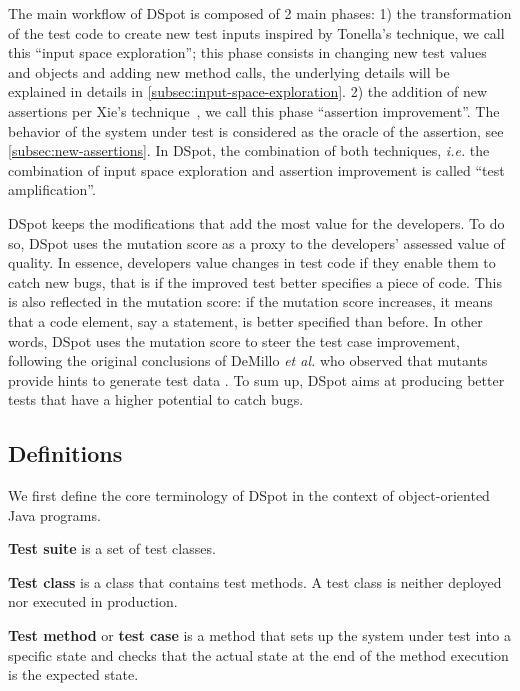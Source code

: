 \documentclass[table,xcdraw,smallextended]{svjour3}
\newcommand{\etal}{\textit{et al.}\xspace}
\newcommand{\ie}{\textit{i.e.}\xspace}
\newcommand{\dspot}{DSpot\xspace}
\newcommand{\ms}{mutation score\xspace}
\begin{document}
The main workflow of \dspot{} is composed of 2 main phases:
1) the transformation of the test code to create new test inputs inspired by Tonella's technique, we call this ``input space exploration''; this phase consists in changing new test values and objects and adding new method calls, the underlying details will be explained in details in \autoref{subsec:input-space-exploration}.
2) the addition of new assertions per Xie's technique~\cite{TaoXie2006}, we call this phase ``assertion improvement''. The behavior of the system under test is considered as the oracle of the assertion, see \autoref{subsec:new-assertions}.
In \dspot, the combination of both techniques, \ie the combination of input space exploration and assertion improvement is called ``test amplification''.

\dspot keeps the modifications that add the most value for the developers.
To do so, \dspot uses the \ms as a proxy to the developers’ assessed value of quality.
In essence, developers value changes in test code if they enable them to catch new bugs, that is if the improved test better specifies a piece of code.
This is also reflected in the \ms: if the \ms increases, it means that a code element, say a statement, is better specified than before. 
In other words, \dspot uses the \ms to steer the test case improvement, following the original conclusions of DeMillo \etal who observed that mutants provide hints to generate test data \cite{demillo1978hints}.
To sum up, \dspot aims at producing better tests that have a higher potential to catch bugs.




\subsection{Definitions}

We first define the core terminology of \dspot in the context of object-oriented Java programs. 

\textbf{Test suite} is a set of test classes.

\textbf{Test class} is a class that contains test methods. A test class is neither deployed nor executed in production.

\textbf{Test method} or \textbf{test case} is a method that sets up the system under test into a specific state and checks that the actual state at the end of the method execution is the expected state.
\end{document}
